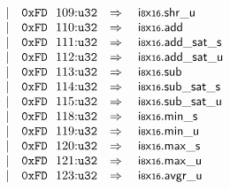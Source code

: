 $$\begin{array}[t]{@{}lrrl@{}l@{}l@{}l@{}}
& & | & \mathtt{0xFD}~~109{:}{\mathtt{u32}} & \quad\Rightarrow\quad{} & {\mathsf{i{\scriptstyle 8}}}{\mathsf{x}}{\mathsf{{\scriptstyle 16}}} {.} {\mathsf{shr}}{\mathsf{\_}}{\mathsf{u}} \\
& & | & \mathtt{0xFD}~~110{:}{\mathtt{u32}} & \quad\Rightarrow\quad{} & {\mathsf{i{\scriptstyle 8}}}{\mathsf{x}}{\mathsf{{\scriptstyle 16}}} {.} \mathsf{add} \\
& & | & \mathtt{0xFD}~~111{:}{\mathtt{u32}} & \quad\Rightarrow\quad{} & {\mathsf{i{\scriptstyle 8}}}{\mathsf{x}}{\mathsf{{\scriptstyle 16}}} {.} {\mathsf{add\_sat}}{\mathsf{\_}}{\mathsf{s}} \\
& & | & \mathtt{0xFD}~~112{:}{\mathtt{u32}} & \quad\Rightarrow\quad{} & {\mathsf{i{\scriptstyle 8}}}{\mathsf{x}}{\mathsf{{\scriptstyle 16}}} {.} {\mathsf{add\_sat}}{\mathsf{\_}}{\mathsf{u}} \\
& & | & \mathtt{0xFD}~~113{:}{\mathtt{u32}} & \quad\Rightarrow\quad{} & {\mathsf{i{\scriptstyle 8}}}{\mathsf{x}}{\mathsf{{\scriptstyle 16}}} {.} \mathsf{sub} \\
& & | & \mathtt{0xFD}~~114{:}{\mathtt{u32}} & \quad\Rightarrow\quad{} & {\mathsf{i{\scriptstyle 8}}}{\mathsf{x}}{\mathsf{{\scriptstyle 16}}} {.} {\mathsf{sub\_sat}}{\mathsf{\_}}{\mathsf{s}} \\
& & | & \mathtt{0xFD}~~115{:}{\mathtt{u32}} & \quad\Rightarrow\quad{} & {\mathsf{i{\scriptstyle 8}}}{\mathsf{x}}{\mathsf{{\scriptstyle 16}}} {.} {\mathsf{sub\_sat}}{\mathsf{\_}}{\mathsf{u}} \\
& & | & \mathtt{0xFD}~~118{:}{\mathtt{u32}} & \quad\Rightarrow\quad{} & {\mathsf{i{\scriptstyle 8}}}{\mathsf{x}}{\mathsf{{\scriptstyle 16}}} {.} {\mathsf{min}}{\mathsf{\_}}{\mathsf{s}} \\
& & | & \mathtt{0xFD}~~119{:}{\mathtt{u32}} & \quad\Rightarrow\quad{} & {\mathsf{i{\scriptstyle 8}}}{\mathsf{x}}{\mathsf{{\scriptstyle 16}}} {.} {\mathsf{min}}{\mathsf{\_}}{\mathsf{u}} \\
& & | & \mathtt{0xFD}~~120{:}{\mathtt{u32}} & \quad\Rightarrow\quad{} & {\mathsf{i{\scriptstyle 8}}}{\mathsf{x}}{\mathsf{{\scriptstyle 16}}} {.} {\mathsf{max}}{\mathsf{\_}}{\mathsf{s}} \\
& & | & \mathtt{0xFD}~~121{:}{\mathtt{u32}} & \quad\Rightarrow\quad{} & {\mathsf{i{\scriptstyle 8}}}{\mathsf{x}}{\mathsf{{\scriptstyle 16}}} {.} {\mathsf{max}}{\mathsf{\_}}{\mathsf{u}} \\
& & | & \mathtt{0xFD}~~123{:}{\mathtt{u32}} & \quad\Rightarrow\quad{} & {\mathsf{i{\scriptstyle 8}}}{\mathsf{x}}{\mathsf{{\scriptstyle 16}}} {.} {\mathsf{avgr}}{\mathsf{\_}}{\mathsf{u}} \\

\end{array}$$
